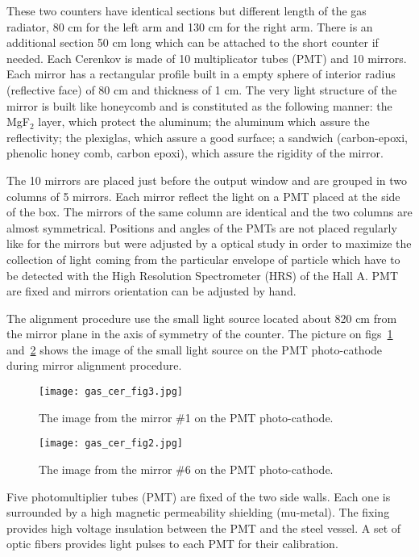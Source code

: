 These two counters have identical sections but different length of 
the gas radiator, 80 cm for the left arm and 130 cm for the right arm. 
There is an additional section 50 cm long which can be attached to 
the short counter if needed.
Each Cerenkov is made of 10 multiplicator tubes (PMT) and 10 mirrors. 
Each mirror has a rectangular profile built in a empty sphere of interior radius 
(reflective face) of 80 cm and thickness of 1 cm. 
The very light structure of the mirror is built like honeycomb 
and is constituted as the following manner: the MgF$_2$ layer, which protect 
the aluminum; the aluminum which assure the reflectivity; 
the plexiglas, which assure a good surface; 
a sandwich (carbon-epoxi, phenolic honey comb, carbon epoxi), 
which assure the rigidity of the mirror. 

The 10 mirrors are placed just before the output window and are grouped in 
two columns of 5 mirrors. 
Each mirror reflect the light on a PMT placed at the side of the box. 
The mirrors of the same column are identical and the two columns are 
almost symmetrical. 
Positions and angles of the PMTs are not placed regularly like for the mirrors 
but were adjusted by a optical study in order to maximize the collection of light 
coming from the particular envelope of particle which have to be detected with 
the High Resolution Spectrometer (HRS) of the Hall A. 
PMT are fixed and mirrors orientation can be adjusted by hand. 

The alignment procedure use the small light source located about 820 cm
from the mirror plane in the axis of symmetry of the counter.
The picture on figs~\ref{fig:mirror-1} and~\ref{fig:mirror-6} 
shows the image of the small light source on the PMT photo-cathode during 
mirror alignment procedure. 
%
\begin{figure}[p]
\texttt{[image: gas\_cer\_fig3.jpg]}
\caption[The image from mirror \#1 on PMT photo-cathode]
{ The image from the mirror \#1 on the PMT photo-cathode.}
\label{fig:mirror-1}
\end{figure}
%
\begin{figure}[p]
\texttt{[image: gas\_cer\_fig2.jpg]}
\caption[The image from mirror \#6 on PMT photo-cathode]
{ The image from the mirror \#6 on the PMT photo-cathode.}
\label{fig:mirror-6}
\end{figure}

Five photomultiplier tubes (PMT) are fixed of the two side walls. 
Each one is surrounded by a high magnetic permeability shielding (mu-metal). 
The fixing provides high voltage insulation between the PMT and the steel vessel. 
A set of optic fibers provides light pulses to each PMT for their calibration. 

